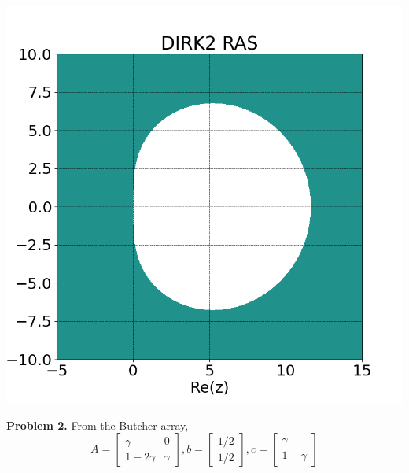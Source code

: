 \documentclass{article}
\def\tbf#1{\textbf{#1}}
\newcommand{\m}[2][b]{\begin{#1matrix}#2\end{#1matrix}}
\newcommand{\sep}[1][.5cm]{\vspace{#1}}
\begin{document}
\begin{center}
	\includegraphics[scale=.3]{hw3 dirk2 RAS}
\end{center}
\sep



\tbf{Problem 2.} From the Butcher array,
$$A = \m{\gamma & 0 \\ 1-2\gamma & \gamma},
b = \m{1/2 \\ 1/2},
c = \m{\gamma \\ 1-\gamma}$$
\end{document}
